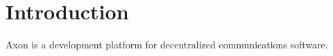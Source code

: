 %

\chapter{Introduction}

Axon is a development platform for decentralized communications
software.~\cite{baran_distributed_1964}
